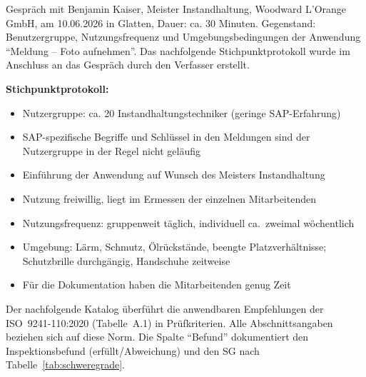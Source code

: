 \startAnhang

\listofanhang
\clearpage

%

\label{anhang:gespraech}

Gespräch mit Benjamin Kaiser, Meister Instandhaltung, Woodward L'Orange
GmbH, am 10.06.2026 in Glatten, Dauer: ca. 30 Minuten. Gegenstand:
Benutzergruppe, Nutzungsfrequenz und Umgebungsbedingungen der Anwendung
\enquote{Meldung -- Foto aufnehmen}. Das nachfolgende Stichpunktprotokoll
wurde im Anschluss an das Gespräch durch den Verfasser erstellt.

\bigskip
\textbf{Stichpunktprotokoll:}
\begin{itemize}
  \item Nutzergruppe: ca. 20 Instandhaltungstechniker (geringe SAP-Erfahrung)
  \item SAP-spezifische Begriffe und Schlüssel in den Meldungen sind der
        Nutzergruppe in der Regel nicht geläufig
  \item Einführung der Anwendung auf Wunsch des Meisters Instandhaltung
  \item Nutzung freiwillig, liegt im Ermessen der einzelnen Mitarbeitenden
  \item Nutzungsfrequenz: gruppenweit täglich, individuell ca.\ zweimal
        wöchentlich
  \item Umgebung: Lärm, Schmutz, Ölrückstände, beengte Platzverhältnisse;
        Schutzbrille durchgängig, Handschuhe zeitweise
  \item Für die Dokumentation haben die Mitarbeitenden genug Zeit
        
\end{itemize}


\label{anhang:kriterienkatalog}

Der nachfolgende Katalog überführt die anwendbaren Empfehlungen der
ISO~9241-110:2020 (Tabelle~A.1) in Prüfkriterien. Alle Abschnittsangaben
beziehen sich auf diese Norm. Die Spalte \enquote{Befund} dokumentiert den
Inspektionsbefund (erfüllt/Abweichung) und den \ac{SG} nach
Tabelle~\ref{tab:schweregrade}.

